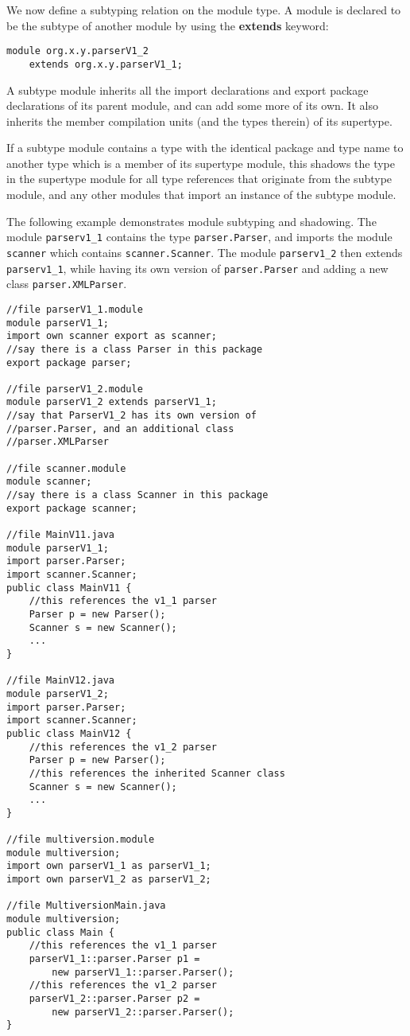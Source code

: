 
We now define a subtyping relation on the module type. A module is declared
to be the subtype of another module by using the \textbf{extends} keyword:

\begin{lstlisting}
module org.x.y.parserV1_2 
	extends org.x.y.parserV1_1;
\end{lstlisting}

A subtype module inherits all the import declarations and export package declarations 
of its parent module, and can add some more of its own. It also inherits the member 
compilation units (and the types therein) of its supertype.

If a subtype module contains a type with the identical package and type name
to another type which is a member of its supertype module, 
this shadows the type in the supertype module for all type references that
originate from the subtype module, and any other modules that import an
instance of the subtype module.

The following example demonstrates module subtyping and shadowing. The module
{\tt parserv1\_1} contains the type {\tt parser.Parser}, and imports
the module {\tt scanner} which contains {\tt scanner.Scanner}. The module
{\tt parserv1\_2} then extends {\tt parserv1\_1}, while having its
own version of {\tt parser.Parser} and adding a new class {\tt parser.XMLParser}.

\begin{lstlisting}[caption=Module Subtyping]
//file parserV1_1.module
module parserV1_1;
import own scanner export as scanner;
//say there is a class Parser in this package
export package parser;

//file parserV1_2.module
module parserV1_2 extends parserV1_1;
//say that ParserV1_2 has its own version of 
//parser.Parser, and an additional class
//parser.XMLParser

//file scanner.module
module scanner;
//say there is a class Scanner in this package
export package scanner;

//file MainV11.java
module parserV1_1;
import parser.Parser;
import scanner.Scanner;
public class MainV11 {
	//this references the v1_1 parser
	Parser p = new Parser(); 
	Scanner s = new Scanner();
	...
}

//file MainV12.java
module parserV1_2;
import parser.Parser;
import scanner.Scanner;
public class MainV12 {
	//this references the v1_2 parser
	Parser p = new Parser(); 
	//this references the inherited Scanner class
	Scanner s = new Scanner();
	...
}

//file multiversion.module
module multiversion;
import own parserV1_1 as parserV1_1;
import own parserV1_2 as parserV1_2;

//file MultiversionMain.java
module multiversion;
public class Main {
	//this references the v1_1 parser
	parserV1_1::parser.Parser p1 = 
		new parserV1_1::parser.Parser();
	//this references the v1_2 parser
	parserV1_2::parser.Parser p2 =
		new parserV1_2::parser.Parser();
}
\end{lstlisting}

